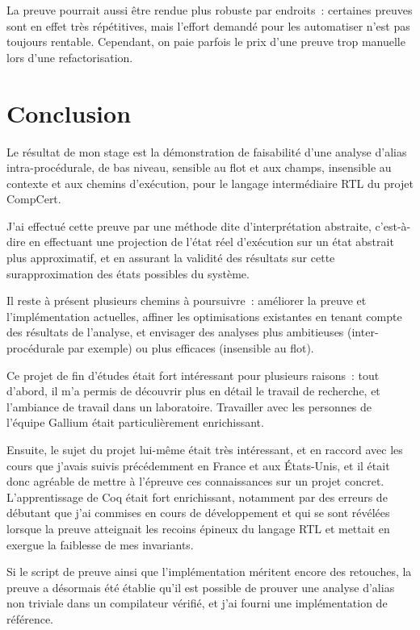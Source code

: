 \documentclass{article}
\begin{document}
La preuve pourrait aussi être rendue plus robuste par endroits~: certaines
preuves sont en effet très répétitives, mais l'effort demandé pour les
automatiser n'est pas toujours rentable. Cependant, on paie parfois le prix
d'une preuve trop manuelle lors d'une refactorisation.

\newpage
\section{Conclusion}

Le résultat de mon stage est la démonstration de faisabilité d'une analyse
d'alias intra-procédurale, de bas niveau, sensible au flot et aux champs,
insensible au contexte et aux chemins d'exécution, pour le langage
intermédiaire RTL du projet CompCert.

J'ai effectué cette preuve par une méthode dite d'interprétation abstraite,
c'est-à-dire en effectuant une projection de l'état réel d'exécution sur un
état abstrait plus approximatif, et en assurant la validité des résultats sur
cette surapproximation des états possibles du système.

Il reste à présent plusieurs chemins à poursuivre~: améliorer la preuve et
l'implémentation actuelles, affiner les optimisations existantes en tenant
compte des résultats de l'analyse, et envisager des analyses plus ambitieuses
(inter-procédurale par exemple) ou plus efficaces (insensible au flot).

Ce projet de fin d'études était fort intéressant pour plusieurs raisons~: tout
d'abord, il m'a permis de découvrir plus en détail le travail de recherche, et
l'ambiance de travail dans un laboratoire. Travailler avec les personnes de
l'équipe Gallium était particulièrement enrichissant.

Ensuite, le sujet du projet lui-même était très intéressant, et en raccord
avec les cours que j'avais suivis précédemment en France et aux États-Unis, et
il était donc agréable de mettre à l'épreuve ces connaissances sur un projet
concret. L'apprentissage de Coq était fort enrichissant, notamment par des
erreurs de débutant que j'ai commises en cours de développement et qui se sont
révélées lorsque la preuve atteignait les recoins épineux du langage RTL et
mettait en exergue la faiblesse de mes invariants.

Si le script de preuve ainsi que l'implémentation méritent encore des
retouches, la preuve a désormais été établie qu'il est possible de prouver une
analyse d'alias non triviale dans un compilateur vérifié, et j'ai fourni une
implémentation de référence.
\end{document}
